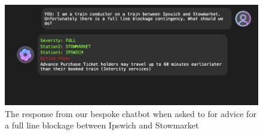 \begin{figure}[!htbp]
    \centering
    \includegraphics[width=\textwidth]{Diagrams/LLM examples/Our_chatbot_contingencies.png}
    \caption{The response from our bespoke chatbot when asked to for advice for a full line blockage between Ipswich and Stowmarket}
    \label{Fig: Our-bot contingency}
\end{figure}

